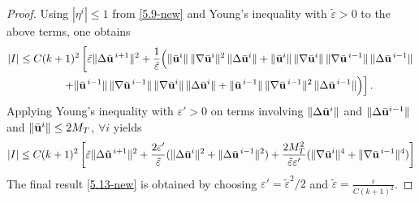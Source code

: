 \documentclass[10pt,a4paper]{amsart}
\begin{document}
\begin{proof}
\medskip

\noindent Using $|\eta^i|\le 1$ from \eqref{5.9-new} and  Young's inequality with $\tilde{\varepsilon}>0$ to the above terms, one obtains
\begin{align}
|I| & \le C (k+1)^2 \left[ \tilde\varepsilon\|\Delta\tilde {\bf u}^{\,i+1}\|^{2} 
 + \frac{1}{\tilde\varepsilon}\Big(
\|\bar {\bf u}^{i}\|\,\|\nabla\bar {\bf u}^{i}\|^{2}\,\|\Delta\bar {\bf u}^{i}\|
+ \|\bar {\bf u}^{i}\|\,\|\nabla\bar {\bf u}^{i}\|\,\|\nabla\bar {\bf u}^{\,i-1}\|\,\|\Delta\bar {\bf u}^{\,i-1}\|
\right.
\notag
\\
& \left. \qquad\qquad
+ \|\bar {\bf u}^{\,i-1}\|\,\|\nabla\bar {\bf u}^{\,i-1}\|\,\|\nabla\bar {\bf u}^{i}\|\,\|\Delta\bar {\bf u}^{i}\|
+ \|\bar {\bf u}^{\,i-1}\|\,\|\nabla\bar {\bf u}^{\,i-1}\|^{2}\,\|\Delta\bar {\bf u}^{\,i-1}\|
\Big) \right].
\end{align}
Applying Young's inequality with $\varepsilon'>0$ on terms involving 
$\|\Delta\bar {\bf u}^{i}\|$ and $\|\Delta\bar {\bf u}^{i-1}\|$ 
and $\|\bar {\bf u}^i\|\le 2M_T$, $\forall i$ yields
\begin{align}
|I| \le 
C(k+1)^2 \left[ 
\tilde\varepsilon \|\Delta\tilde {\bf u}^{\,i+1}\|^2
+ \frac{2\varepsilon'}{\tilde{\varepsilon}}
 ( \|\Delta\bar {\bf u}^{i}\|^2 + 
   \|\Delta\bar {\bf u}^{\,i-1}\|^2 )
+ \frac{2M_T^2}{\tilde{\varepsilon} \varepsilon'}
  ( \|\nabla\bar {\bf u}^i\|^4 +
   \|\nabla\bar {\bf u}^{\,i-1}\|^4)
   \right]
\end{align}
The final result \eqref{5.13-new} is obtained by choosing $\varepsilon'=\tilde{\varepsilon}^2/2$ and
$\tilde{\varepsilon}=\frac{\varepsilon}{C(k+1)^2}$.
\end{proof}
\end{document}
